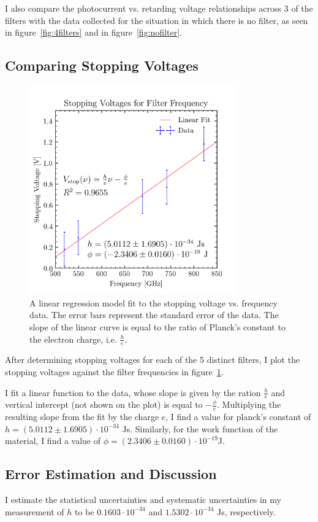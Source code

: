 \documentclass[aps,twocolumn,secnumarabic,balancelastpage,amsmath,amssymb,nofootinbib, floatfix]{revtex4-2}
\begin{document}
I also compare the photocurrent vs. retarding voltage relationships across 3 of the filters with the data collected for the situation in which there is no filter, as seen in figure~\ref{fig:4filters} and in figure~\ref{fig:nofilter}.

\subsection{Comparing Stopping Voltages} 

\begin{figure}[H]
	\includegraphics[width=9cm]{stopping_volts.png}
	\caption{A linear regression model fit to the stopping voltage vs. frequency data. The error bars represent the standard error of the data. The slope of the linear curve is equal to the ratio of Planck's constant to the electron charge, i.e. $\frac{h}{e}$.}
	\label{fig:stoppingvolts}
\end{figure}

After determining stopping voltages for each of the 5 distinct filters, I plot the stopping voltages against the filter frequencies in figure~\ref{fig:stoppingvolts}.

I fit a linear function to the data, whose slope is given by the ration $\frac{h}{e}$ and vertical intercept (not shown on the plot) is equal to $-\frac{\phi}{e}$. Multiplying the resulting slope from the fit by the charge $e$, I find a value for planck's constant of $h=(5.0112\pm 1.6905)\cdot 10^{-34}$ Js. Similarly, for the work function of the material, I find a value of $\phi=(2.3406\pm 0.0160)\cdot  10^{-19}$J.

\subsection{Error Estimation and Discussion}
I estimate the statistical uncertainties and systematic uncertainties in my measurement of $h$ to be $0.1603\cdot10^{-34}$ and $1.5302\cdot10^{-34}$ Js, respectively. 
\end{document}
